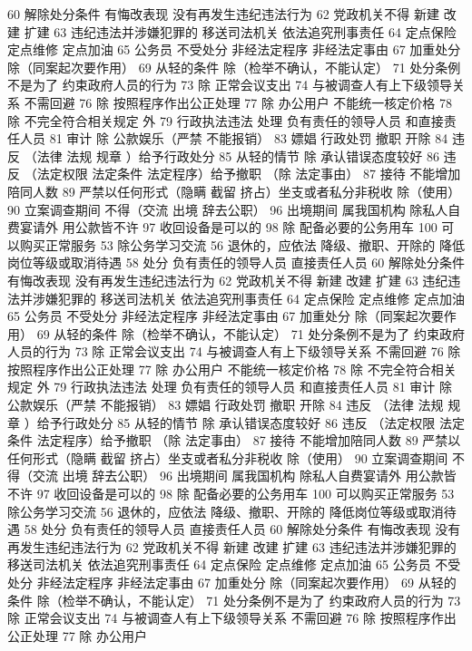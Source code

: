 \documentclass[cyan]{elegantnote}
\begin{document}
60 解除处分条件
有悔改表现
没有再发生违纪违法行为
62 党政机关不得
新建 改建 扩建
63 违纪违法并涉嫌犯罪的
移送司法机关
依法追究刑事责任
64 定点保险 定点维修 定点加油
65 公务员 不受处分
非经法定程序
非经法定事由
67 加重处分
除（同案起次要作用）
69 从轻的条件
除（检举不确认，不能认定）
71 处分条例不是为了
约束政府人员的行为
73 除 正常会议支出
74 与被调查人有上下级领导关系 不需回避
76 除 按照程序作出公正处理
77 除 办公用户
不能统一核定价格
78 除 不完全符合相关规定 外
79 行政执法违法 处理
负有责任的领导人员
和直接责任人员
81 审计
除 公款娱乐（严禁 不能报销）
83 嫖娼 行政处罚
撤职 开除
84 违反 （法律 法规 规章 ）给予行政处分
85 从轻的情节
除 承认错误态度较好
86 违反 （法定权限 法定条件 法定程序）给予撤职
（除 法定事由）
87 接待 不能增加陪同人数
89 严禁以任何形式（隐瞒 截留 挤占）坐支或者私分非税收
除（使用）
90 立案调查期间 不得（交流 出境 辞去公职）
96 出境期间 属我国机构 除私人自费宴请外 用公款皆不许
97 收回设备是可以的
98 除 配备必要的公务用车
100 可以购买正常服务
53 除公务学习交流
56 退休的，应依法
降级、撤职、开除的 降低岗位等级或取消待遇
58 处分
负有责任的领导人员
直接责任人员
60 解除处分条件
有悔改表现
没有再发生违纪违法行为
62 党政机关不得
新建 改建 扩建
63 违纪违法并涉嫌犯罪的
移送司法机关
依法追究刑事责任
64 定点保险 定点维修 定点加油
65 公务员 不受处分
非经法定程序
非经法定事由
67 加重处分
除（同案起次要作用）
69 从轻的条件
除（检举不确认，不能认定）
71 处分条例不是为了
约束政府人员的行为
73 除 正常会议支出
74 与被调查人有上下级领导关系 不需回避
76 除 按照程序作出公正处理
77 除 办公用户
不能统一核定价格
78 除 不完全符合相关规定 外
79 行政执法违法 处理
负有责任的领导人员
和直接责任人员
81 审计
除 公款娱乐（严禁 不能报销）
83 嫖娼 行政处罚
撤职 开除
84 违反 （法律 法规 规章 ）给予行政处分
85 从轻的情节
除 承认错误态度较好
86 违反 （法定权限 法定条件 法定程序）给予撤职
（除 法定事由）
87 接待 不能增加陪同人数
89 严禁以任何形式（隐瞒 截留 挤占）坐支或者私分非税收
除（使用）
90 立案调查期间 不得（交流 出境 辞去公职）
96 出境期间 属我国机构 除私人自费宴请外 用公款皆不许
97 收回设备是可以的
98 除 配备必要的公务用车
100 可以购买正常服务
53 除公务学习交流
56 退休的，应依法
降级、撤职、开除的 降低岗位等级或取消待遇
58 处分
负有责任的领导人员
直接责任人员
60 解除处分条件
有悔改表现
没有再发生违纪违法行为
62 党政机关不得
新建 改建 扩建
63 违纪违法并涉嫌犯罪的
移送司法机关
依法追究刑事责任
64 定点保险 定点维修 定点加油
65 公务员 不受处分
非经法定程序
非经法定事由
67 加重处分
除（同案起次要作用）
69 从轻的条件
除（检举不确认，不能认定）
71 处分条例不是为了
约束政府人员的行为
73 除 正常会议支出
74 与被调查人有上下级领导关系 不需回避
76 除 按照程序作出公正处理
77 除 办公用户
\end{document}
